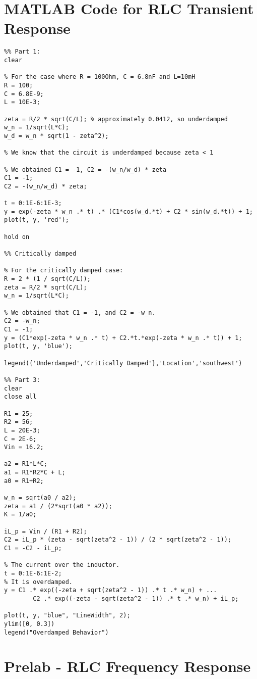 \section{MATLAB Code for RLC Transient Response}
\begin{verbatim}
%% Part 1:
clear

% For the case where R = 100Ohm, C = 6.8nF and L=10mH
R = 100;
C = 6.8E-9;
L = 10E-3;

zeta = R/2 * sqrt(C/L); % approximately 0.0412, so underdamped
w_n = 1/sqrt(L*C);
w_d = w_n * sqrt(1 - zeta^2);

% We know that the circuit is underdamped because zeta < 1

% We obtained C1 = -1, C2 = -(w_n/w_d) * zeta
C1 = -1;
C2 = -(w_n/w_d) * zeta;

t = 0:1E-6:1E-3;
y = exp(-zeta * w_n .* t) .* (C1*cos(w_d.*t) + C2 * sin(w_d.*t)) + 1;
plot(t, y, 'red');

hold on

%% Critically damped

% For the critically damped case:
R = 2 * (1 / sqrt(C/L));
zeta = R/2 * sqrt(C/L);
w_n = 1/sqrt(L*C);

% We obtained that C1 = -1, and C2 = -w_n.
C2 = -w_n;
C1 = -1;
y = (C1*exp(-zeta * w_n .* t) + C2.*t.*exp(-zeta * w_n .* t)) + 1;
plot(t, y, 'blue');

legend({'Underdamped','Critically Damped'},'Location','southwest')

%% Part 3:
clear
close all

R1 = 25;
R2 = 56;
L = 20E-3;
C = 2E-6;
Vin = 16.2;

a2 = R1*L*C;
a1 = R1*R2*C + L;
a0 = R1+R2;

w_n = sqrt(a0 / a2);
zeta = a1 / (2*sqrt(a0 * a2));
K = 1/a0;

iL_p = Vin / (R1 + R2);
C2 = iL_p * (zeta - sqrt(zeta^2 - 1)) / (2 * sqrt(zeta^2 - 1));
C1 = -C2 - iL_p;

% The current over the inductor.
t = 0:1E-6:1E-2;
% It is overdamped.
y = C1 .* exp((-zeta + sqrt(zeta^2 - 1)) .* t .* w_n) + ...
        C2 .* exp((-zeta - sqrt(zeta^2 - 1)) .* t .* w_n) + iL_p;

plot(t, y, "blue", "LineWidth", 2);
ylim([0, 0.3])
legend("Overdamped Behavior")    
\end{verbatim}

\section{Prelab - RLC Frequency Response}
